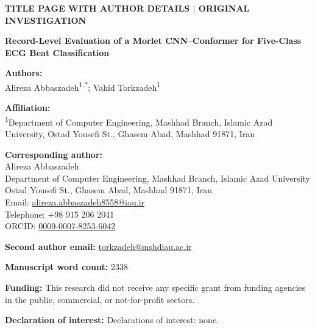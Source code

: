 \documentclass[11pt,a4paper]{article}
\begin{document}
\begin{flushleft}
\textbf{\small TITLE PAGE WITH AUTHOR DETAILS $\mid$ ORIGINAL INVESTIGATION}
\end{flushleft}

\vspace{0.4cm}
\begin{center}
  {\Large \textbf{Record-Level Evaluation of a Morlet CNN--Conformer for Five-Class ECG Beat Classification}}
\end{center}

\vspace{0.5cm}
\textbf{Authors:}\\
Alireza Abbaszadeh\textsuperscript{1,*}; Vahid Torkzadeh\textsuperscript{1}

\vspace{0.35cm}
\textbf{Affiliation:}\\
\textsuperscript{1}Department of Computer Engineering, Mashhad Branch, Islamic Azad University, Ostad Yousefi St., Ghasem Abad, Mashhad 91871, Iran

\vspace{0.35cm}
\textbf{Corresponding author:}\\
Alireza Abbaszadeh\\
Department of Computer Engineering, Mashhad Branch, Islamic Azad University\\
Ostad Yousefi St., Ghasem Abad, Mashhad 91871, Iran\\
Email: \href{mailto:alireza.abbaszadeh8558@iau.ir}{alireza.abbaszadeh8558@iau.ir}\\
Telephone: +98 915 206 2041\\
ORCID: \href{https://orcid.org/0009-0007-8253-6042}{0009-0007-8253-6042}

\vspace{0.35cm}
\textbf{Second author email:} \href{mailto:torkzadeh@mshdiau.ac.ir}{torkzadeh@mshdiau.ac.ir}

\vspace{0.35cm}
\textbf{Manuscript word count:} 2338

\vspace{0.35cm}
\textbf{Funding:} This research did not receive any specific grant from funding agencies in the public, commercial, or not-for-profit sectors.

\vspace{0.35cm}
\textbf{Declaration of interest:} Declarations of interest: none.
\end{document}
